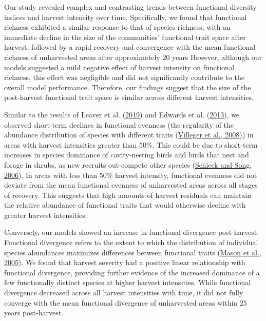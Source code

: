 \documentclass[
  12pt,
]{article}
\begin{document}
Our study revealed complex and contrasting trends between functional diversity indices and harvest intensity over time. Specifically, we found that functional richness exhibited a similar response to that of species richness, with an immediate decline in the size of the communities' functional trait space after harvest, followed by a rapid recovery and convergence with the mean functional richness of unharvested areas after approximately 20 years However, although our models suggested a mild negative effect of harvest intensity on functional richness, this effect was negligible and did not significantly contribute to the overall model performance. Therefore, our findings suggest that the size of the post-harvest functional trait space is similar across different harvest intensities.

Similar to the results of Leaver et al. (\protect\hyperlink{ref-leaver2019response}{2019}) and Edwards et al. (\protect\hyperlink{ref-edwards2013impacts}{2013}), we observed short-term declines in functional evenness (the regularity of the abundance distribution of species with different traits (\protect\hyperlink{ref-villegerNewMultidimensionalFunctional2008}{Villeger et al., 2008})) in areas with harvest intensities greater than 50\%. This could be due to short-term increases in species dominance of cavity-nesting birds and birds that nest and forage in shrubs, as new recruits out-compete other species (\protect\hyperlink{ref-Schieck2006}{Schieck and Song, 2006}). In areas with less than 50\% harvest intensity, functional evenness did not deviate from the mean functional evenness of unharvested areas across all stages of recovery. This suggests that high amounts of harvest residuals can maintain the relative abundance of functional traits that would otherwise decline with greater harvest intensities.

Conversely, our models showed an increase in functional divergence post-harvest. Functional divergence refers to the extent to which the distribution of individual species abundances maximizes differences between functional traits (\protect\hyperlink{ref-masonFunctionalRichnessFunctional2005}{Mason et al., 2005}). We found that harvest severity had a positive linear relationship with functional divergence, providing further evidence of the increased dominance of a few functionally distinct species at higher harvest intensities. While functional divergence decreased across all harvest intensities with time, it did not fully converge with the mean functional divergence of unharvested areas within 25 years post-harvest.
\end{document}
